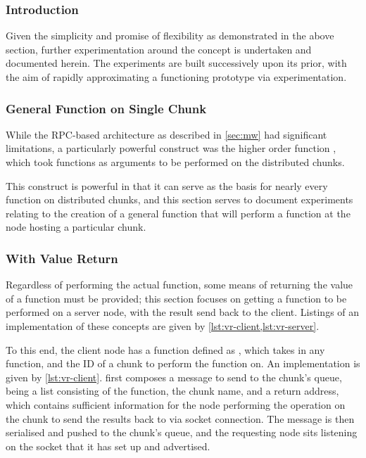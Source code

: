 \subsubsection{Introduction}

Given the simplicity and promise of flexibility as demonstrated in the above section, further experimentation around the concept is undertaken and documented herein.
The experiments are built successively upon its prior, with the aim of rapidly approximating a functioning prototype via experimentation.

\subsubsection{General Function on Single Chunk}

While the RPC-based architecture as described in \cref{sec:mw} had significant limitations, a particularly powerful construct was the higher order function , which took functions as arguments to be performed on the distributed chunks.

This construct is powerful in that it can serve as the basis for nearly every function on distributed chunks, and this section serves to document experiments relating to the creation of a general function that will perform a function at the node hosting a particular chunk.

\subsubsection{With Value Return}\label{sec:val-ret}

Regardless of performing the actual function, some means of returning the value of a function must be provided; this section focuses on getting a function to be performed on a server node, with the result send back to the client.
Listings of an implementation of these concepts are given by \cref{lst:vr-client,lst:vr-server}.



To this end, the client node has a function defined as , which takes in any function, and the ID of a chunk to perform the function on.
An implementation is given by \cref{lst:vr-client}.
 first composes a message to send to the chunk's queue, being a
list consisting of the function, the chunk name, and a return address, which
contains sufficient information for the node performing the operation on the
chunk to send the results back to via socket connection.
The message is then serialised and pushed to the chunk's queue, and the requesting node sits listening on the socket that it has set up and advertised.

